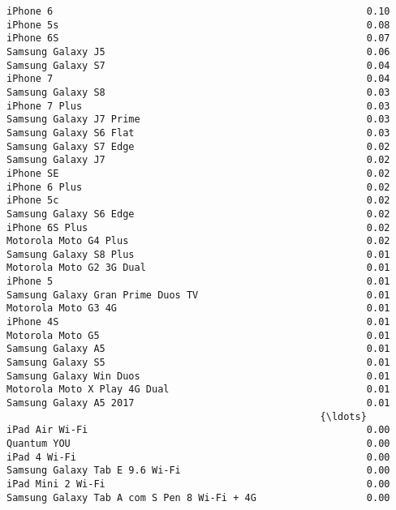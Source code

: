 \documentclass[11pt]{article}
\begin{document}
    \begin{Verbatim}[commandchars=\\\{\}]
iPhone 6                                                      0.10
iPhone 5s                                                     0.08
iPhone 6S                                                     0.07
Samsung Galaxy J5                                             0.06
Samsung Galaxy S7                                             0.04
iPhone 7                                                      0.04
Samsung Galaxy S8                                             0.03
iPhone 7 Plus                                                 0.03
Samsung Galaxy J7 Prime                                       0.03
Samsung Galaxy S6 Flat                                        0.03
Samsung Galaxy S7 Edge                                        0.02
Samsung Galaxy J7                                             0.02
iPhone SE                                                     0.02
iPhone 6 Plus                                                 0.02
iPhone 5c                                                     0.02
Samsung Galaxy S6 Edge                                        0.02
iPhone 6S Plus                                                0.02
Motorola Moto G4 Plus                                         0.02
Samsung Galaxy S8 Plus                                        0.01
Motorola Moto G2 3G Dual                                      0.01
iPhone 5                                                      0.01
Samsung Galaxy Gran Prime Duos TV                             0.01
Motorola Moto G3 4G                                           0.01
iPhone 4S                                                     0.01
Motorola Moto G5                                              0.01
Samsung Galaxy A5                                             0.01
Samsung Galaxy S5                                             0.01
Samsung Galaxy Win Duos                                       0.01
Motorola Moto X Play 4G Dual                                  0.01
Samsung Galaxy A5 2017                                        0.01
                                                      {\ldots}         
iPad Air Wi-Fi                                                0.00
Quantum YOU                                                   0.00
iPad 4 Wi-Fi                                                  0.00
Samsung Galaxy Tab E 9.6 Wi-Fi                                0.00
iPad Mini 2 Wi-Fi                                             0.00
Samsung Galaxy Tab A com S Pen 8 Wi-Fi + 4G                   0.00

\end{Verbatim}
\end{document}
